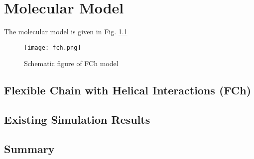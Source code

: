 
\chapter{Molecular Model}
The molecular model is given in Fig. \ref{fig:fch}

\begin{figure}[h!]
 	\centering
 	\texttt{[image: fch.png]} \\
	\caption[Schematic of FCh model]{Schematic figure of FCh model\cite{Liang2019PRE}}
	\label{fig:fch}
\end{figure}

\section{Flexible Chain with Helical Interactions (FCh)}

\section{Existing Simulation Results}

\section{Summary}

